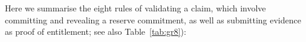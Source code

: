 Here we summarise the eight rules of validating a claim, which involve committing and revealing a reserve commitment, as well as submitting evidence as proof of entitlement; see also Table~\ref{tab:gr8}):%
%
%
